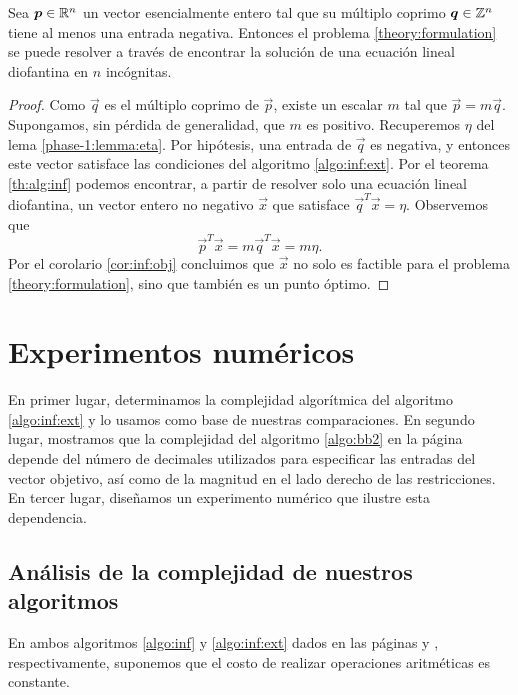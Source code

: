 \begin{theorem}
	\label{infinite:th:complexity}
	Sea $\boldsymbol{p} \in \mathbb{R}^n$ un vector esencialmente entero tal que su múltiplo coprimo $\boldsymbol{q} \in
	\mathbb{Z}^n$ tiene al menos una entrada negativa. Entonces el problema \eqref{theory:formulation} se
	puede resolver a través de encontrar la solución de una ecuación lineal diofantina en $n$
	incógnitas.
\end{theorem}
\begin{proof}
	Como $\vec{q}$ es el múltiplo coprimo de $\vec{p}$, existe un escalar $m$ tal que
	$\vec{p} = m\vec{q}$. Supongamos, sin pérdida de generalidad, que $m$ es positivo. Recuperemos
	$\eta$ del lema \ref{phase-1:lemma:eta}. Por hipótesis, una entrada de $\vec{q}$ es negativa, y
	entonces este vector satisface las condiciones del algoritmo \ref{algo:inf:ext}. Por el teorema
	\ref{th:alg:inf} podemos encontrar, a partir de resolver solo una ecuación lineal diofantina, un
	vector entero no negativo $\vec{x}$ que satisface $\vec{q}^T\vec{x} = \eta$. Observemos que
	\begin{equation*}
		\vec{p}^T\vec{x} = m\vec{q}^T\vec{x} = m\eta.
	\end{equation*}
	Por el corolario \ref{cor:inf:obj} concluimos que $\vec{x}$ no solo es factible para el problema
	\eqref{theory:formulation}, sino que también es un punto óptimo.
\end{proof}

\section{Experimentos numéricos}
\label{sec:inf:exp}
\noindent
En primer lugar, determinamos la complejidad algorítmica del algoritmo \ref{algo:inf:ext} y lo
usamos como base de nuestras comparaciones. En segundo lugar, mostramos que la complejidad del
algoritmo \ref{algo:bb2} en la página \pageref{algo:bb2} depende del número de decimales utilizados
para especificar las entradas del vector objetivo, así como de la magnitud en el lado derecho de las
restricciones. En tercer lugar, diseñamos un experimento numérico que ilustre esta dependencia.

\subsection{Análisis de la complejidad de nuestros algoritmos}
\label{subsec:inf:complex}
\noindent
En ambos algoritmos \ref{algo:inf} y \ref{algo:inf:ext} dados en las páginas \pageref{algo:inf} y
\pageref{algo:inf:ext}, respectivamente, suponemos que el costo de realizar operaciones aritméticas
es constante.

